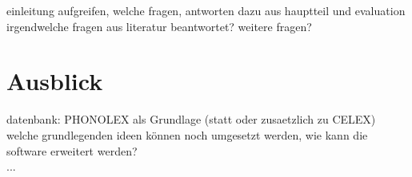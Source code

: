 einleitung aufgreifen, welche fragen, antworten dazu aus hauptteil und evaluation\\
irgendwelche fragen aus literatur beantwortet?
weitere fragen?

\section{Ausblick}

datenbank: PHONOLEX als Grundlage (statt oder zusaetzlich zu CELEX)\\
welche grundlegenden ideen können noch umgesetzt werden, wie kann die software erweitert werden?\\
...